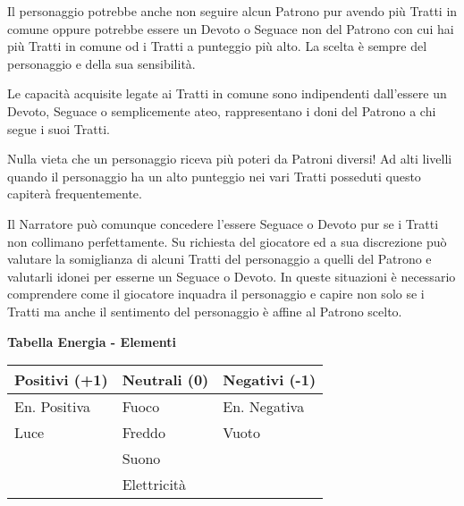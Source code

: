 \begin{multicols}{2}
Il personaggio potrebbe anche non seguire alcun Patrono pur avendo più Tratti in comune oppure potrebbe essere un Devoto o Seguace non del Patrono con cui hai più Tratti in comune od i Tratti a punteggio più alto. La scelta è sempre del personaggio e della sua sensibilità.

Le capacità acquisite legate ai Tratti in comune sono indipendenti dall'essere un Devoto, Seguace o semplicemente ateo, rappresentano i doni del Patrono a chi segue i suoi Tratti.

Nulla vieta che un personaggio riceva più poteri da Patroni diversi! Ad alti livelli quando il personaggio ha un alto punteggio nei vari Tratti posseduti questo capiterà frequentemente. 

\begin{narratore}[Adattarsi]
Il Narratore può comunque concedere l'essere Seguace o Devoto pur se i Tratti non collimano perfettamente. Su richiesta del giocatore ed a sua discrezione può valutare la somiglianza di alcuni Tratti del personaggio a quelli del Patrono e valutarli idonei per esserne un Seguace o Devoto. In queste situazioni è necessario comprendere come il giocatore inquadra il personaggio e capire non solo se i Tratti ma anche il sentimento del personaggio è affine al Patrono scelto.
\end{narratore}


\medskip

\textbf{Tabella Energia - Elementi}

\medskip

\noindent\begin{tabular}{lll}
	\toprule
\textbf{Positivi} (+1) & \textbf{Neutrali} (0) & \textbf{Negativi} (-1)\\
\toprule
En. Positiva& Fuoco& En. Negativa\\
Luce & Freddo& Vuoto\\
& Suono & \\
& Elettricità &
\end{tabular}


\end{multicols}
